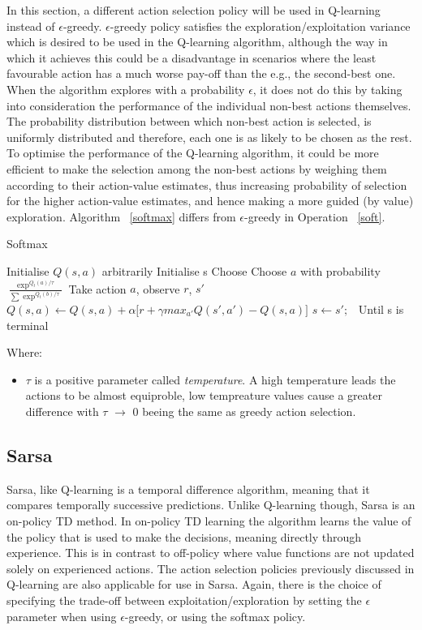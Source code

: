 \documentclass[11pt]{article}
\begin{document}
In this section, a different action selection policy will be used in Q-learning instead of $\epsilon$-greedy. $\epsilon$-greedy policy satisfies the exploration/exploitation variance which is desired to be used in the Q-learning algorithm, although the way in which it achieves this could be a disadvantage in scenarios where the least favourable action has a much worse pay-off than the e.g., the second-best one. When the algorithm explores with a probability $\epsilon$, it does not do this by taking into consideration the performance of the individual non-best actions themselves. The probability distribution between which non-best action is selected, is uniformly distributed and therefore, each one is as likely to be chosen as the rest. To optimise the performance of the Q-learning algorithm, it could be more efficient to make the selection among the non-best actions by weighing them according to their action-value estimates, thus increasing probability of selection for the higher action-value estimates, and hence making a more guided (by value) exploration.
Algorithm ~\ref{softmax} differs from $\epsilon$-greedy in Operation ~\ref{soft}.

\begin{algorithm}
\caption{Softmax}
\begin{algorithmic}[1]
\label{softmax}
\STATE Initialise $Q(s,a)$ arbitrarily
\STATE Initialise s
\STATE Choose Choose $a$ with probability $\frac{\exp^{Q_t(a)/\tau}}{\sum{\exp^{Q_t(b)/\tau}}}$ \label{soft}
\STATE Take action $a$, observe $r$, $s'$
\STATE $Q(s,a) \leftarrow Q(s,a) + \alpha \lbrack r + \gamma max_{a'} Q(s',a') - Q(s,a)\rbrack$
\STATE $s \leftarrow s';$\
\ENDFOR
\STATE Until s is terminal
\ENDFOR
\end{algorithmic}
\end{algorithm}

\noindent Where:
\begin{itemize}
	\item $\tau$ is a positive parameter called \emph{temperature}. A high temperature leads the actions to be almost equiproble, low tempreature values cause a greater difference with $\tau$ $\rightarrow$ 0 beeing the same as greedy action selection.
\end{itemize}
\vspace*{10mm}


\subsection{Sarsa}
Sarsa, like Q-learning is a temporal difference algorithm, meaning that it compares temporally successive predictions. Unlike Q-learning though, Sarsa is an on-policy TD method. In on-policy TD learning the algorithm learns the value of the policy that is used to make the decisions, meaning directly through experience. This is in contrast to off-policy where value functions are not updated solely on experienced actions. The action selection policies previously discussed in Q-learning are also applicable for use in Sarsa. Again, there is the choice of specifying the trade-off between exploitation/exploration by setting the $\epsilon$ parameter when using $\epsilon$-greedy, or using the softmax policy.
\end{document}
